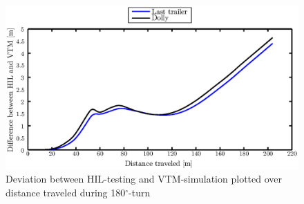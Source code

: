 \documentclass[ExampleMasters.tex]{subfiles}
\begin{document}
\begin{figure}[!htb]
	\centering
	\includegraphics[width=1\linewidth]{figures/compare_HIL_VTS}
	\caption{Deviation between \gls{HIL}-testing and \gls{VTM}-simulation plotted over distance traveled during 180$^\circ$-turn}
	
	\label{fig:compare_HIL_VTS}
\end{figure}
\end{document}
